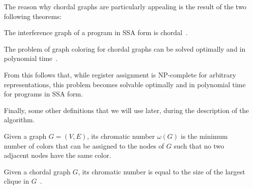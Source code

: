 The reason why chordal graphs are particularly appealing is the result of the two following theorems:

\begin{theorem}[Chordality]
    The interference graph of a program in SSA form is chordal~\cite{HGG:2006:RA_SSA}.
\end{theorem}

\begin{theorem}
    The problem of graph coloring for chordal graphs can be solved optimally and in polynomial time~\cite{golumbic2004algorithmic}.
\end{theorem}

From this follows that, while register assignment is NP-complete for arbitrary representations, this problem becomes solvable optimally and in polynomial time for programs in SSA form.

Finally, some other definitions that we will use later, during the description of the algorithm.

\begin{definition}\label{def:chromatic}
    Given a graph $G = (V, E)$, its chromatic number $\omega(G)$ is the minimum number of colors that can be assigned to the nodes of $G$ such that no two adjacent nodes have the same color.
\end{definition}

\begin{theorem}\label{thm:chordal-chromatic}
    Given a chordal graph $G$, its chromatic number is equal to the size of the largest clique in $G$~\cite{golumbic2004algorithmic}.
\end{theorem}